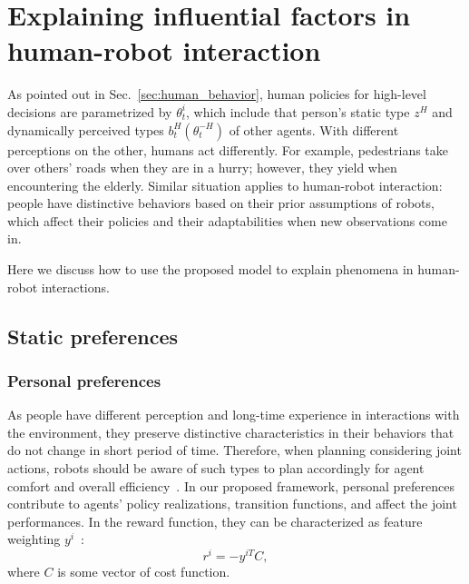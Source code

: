 \documentclass[letterpaper, 10 pt, conference]{ieeeconf}  %
\begin{document}
\section{Explaining influential factors in human-robot interaction}
\vspace{-0.2em}
As pointed out in Sec.~\ref{sec:human_behavior}, human policies for high-level 
decisions are parametrized by $\theta^i_t$, which include that person's static 
type $z^H$ and dynamically perceived types $b^H_t(\theta^{-H}_t)$ of other 
agents. With different perceptions on the other, humans act 
differently. For example, pedestrians take over others' roads when they are in 
a hurry; however, they yield when encountering the elderly. Similar situation 
applies to human-robot interaction: people have distinctive behaviors based on 
their prior assumptions of robots, which affect their policies and their 
adaptabilities when new observations come in.

Here we discuss how to use the proposed model to explain phenomena in human-robot interactions. 
\vspace{-1.3em}
\subsection{Static preferences}
\vspace{-.3em}
\subsubsection{Personal preferences}
As people have different perception and long-time experience in interactions 
with the environment, they preserve distinctive characteristics in their behaviors that 
do not change in short period of time. Therefore, when planning considering joint 
actions, robots should be aware of such types to plan accordingly for agent 
comfort and overall efficiency~\cite{gombolay2015coordination}. In our 
proposed framework, personal preferences contribute to agents' policy 
realizations, transition functions, and affect the joint performances. In the 
reward function, they can be characterized as feature weighting $y^i$~\cite{dorsa2017active}:
\begin{equation}
  r^i = -y^{iT}C, 
\end{equation}
where $C$ is some vector of cost function.
\end{document}
